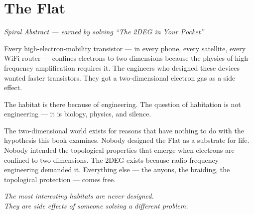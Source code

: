 \section*{The Flat}

\emph{Spiral Abstract — earned by solving ``The 2DEG in Your Pocket''}

\bigskip

Every high-electron-mobility transistor --- in every phone, every satellite, every WiFi router --- confines electrons to two dimensions because the physics of high-frequency amplification requires it. The engineers who designed these devices wanted faster transistors. They got a two-dimensional electron gas as a side effect.

The habitat is there because of engineering. The question of habitation is not engineering --- it is biology, physics, and silence.

The two-dimensional world exists for reasons that have nothing to do with the hypothesis this book examines. Nobody designed the Flat as a substrate for life. Nobody intended the topological properties that emerge when electrons are confined to two dimensions. The 2DEG exists because radio-frequency engineering demanded it. Everything else --- the anyons, the braiding, the topological protection --- comes free.

\bigskip

\begin{center}
\emph{The most interesting habitats are never designed.\\They are side effects of someone solving a different problem.}
\end{center}
